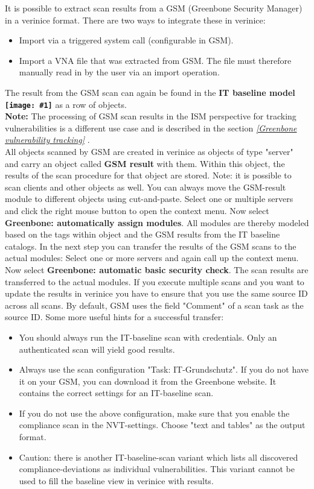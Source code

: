 \documentclass[a4paper,10pt]{book}
\newcommand{\icon}[1]{\texttt{[image: \#1]}}
\begin{document}
It is possible to extract scan results from a GSM (Greenbone Security Manager) in a verinice format.
There are two ways to integrate these in verinice:
 \begin{itemize}
   \item Import via a triggered system call (configurable in GSM).
   \item Import a VNA file that was extracted from GSM. The file must therefore manually read in by the user via an import operation.
 \end{itemize}
 The result from the GSM scan can again be found in the \textbf{IT baseline model \icon{Icon/GS_Modell.png}} as a row of objects.
 \newline\\
 \textbf{Note:} The processing of GSM scan results in the ISM
 perspective for tracking vulnerabilities is a different use case and is described in the section {\em \ref{Greenbone vulnerability tracking} \newline {}}.
 \newline\\
All objects scanned by GSM are created in verinice as objects of type
"server" and carry an object called \textbf{GSM result} with them.
Within this object, the results of the scan procedure for that object are stored.
Note: it is possible to scan clients and other objects as well. You can
always move the GSM-result module to different objects using cut-and-paste.
Select one or multiple servers and click the right mouse button to open the context menu. Now select \textbf{Greenbone: automatically assign modules}.
 All modules are thereby modeled based on the tags within object and the GSM results from the IT baseline catalogs.
 In the next step you can transfer the results of the GSM scans to the
 actual modules:
 Select one or more servers and
 again call up the context menu. Now select \textbf{Greenbone: automatic basic security check}.
The scan results are transferred to the actual modules. If you execute multiple scans and you want to update the results in verinice you have to ensure that you use the same source ID across all scans. By default, GSM uses the field "Comment" of a scan task as the source ID.
Some more useful hints for a successful transfer:
\begin{itemize}
    \item You should always run the IT-baseline scan with credentials. Only an authenticated scan will yield good results.
    \item Always use the scan configuration "Task: IT-Grundschutz". If you do not have it on your GSM, you can download it from the Greenbone website. It contains the correct settings for an IT-baseline scan.
    \item If you do not use the above configuration, make sure that you enable the compliance scan in the NVT-settings. Choose "text and tables" as the output format.
    \item Caution: there is another IT-baseline-scan variant which lists all discovered compliance-deviations as individual vulnerabilities. This variant cannot be used to fill the baseline view in verinice with results.
\end{itemize}
\end{document}

